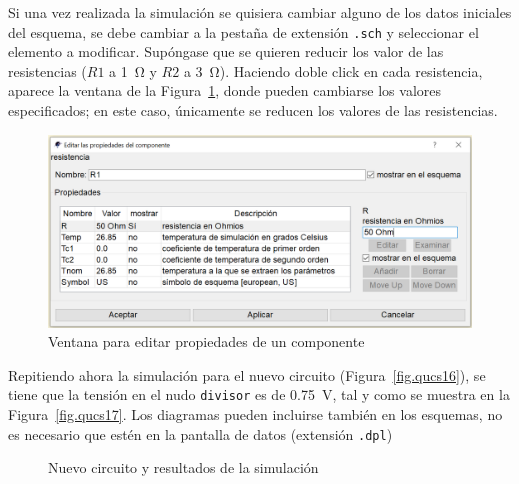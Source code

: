 \documentclass[a4paper,10pt]{article} %
\begin{document}
Si una vez realizada la simulación se quisiera cambiar alguno de los datos iniciales del esquema, se debe cambiar a la pestaña de extensión \texttt{.sch} y seleccionar el elemento a modificar. Supóngase que se quieren reducir los valor de las resistencias ($R1$ a \qty{1}{\ohm} y $R2$ a \qty{3}{\ohm}). Haciendo doble click en cada resistencia, aparece la ventana de la Figura~\ref{fig.qucs15}, donde pueden cambiarse los valores especificados; en este caso, únicamente se reducen los valores de las resistencias. 
\begin{figure}[htbp]
    \centering
    \includegraphics[width=0.9\linewidth]{../figs/qucs15.PNG}
    \caption{Ventana para editar propiedades de un componente}
    \label{fig.qucs15}
\end{figure}

Repitiendo ahora la simulación para el nuevo circuito (Figura~\ref{fig.qucs16}), se tiene que la tensión en el nudo \texttt{divisor} es de \qty{0.75}{\volt}, tal y como se muestra en la Figura~\ref{fig.qucs17}. Los diagramas pueden incluirse también en los esquemas, no es necesario que estén en la pantalla de datos (extensión \texttt{.dpl})
\begin{figure}
    \centering
    \hfil
    \caption{Nuevo circuito y resultados de la simulación}
\end{figure}
\end{document}
